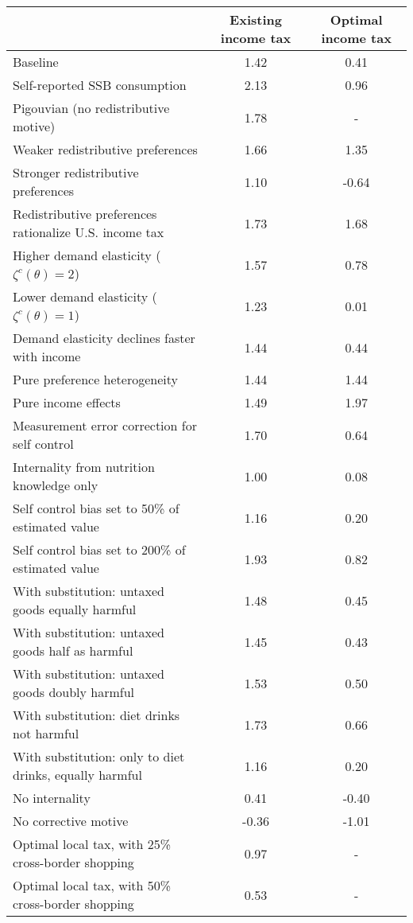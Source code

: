 \begin{tabular}{lcc}
\hline
\hline
 & Existing income tax & Optimal income tax \\
\hline
Baseline & 1.42 & 0.41 \\
Self-reported SSB consumption & 2.13 & 0.96 \\
Pigouvian (no redistributive motive) & 1.78 & - \\
Weaker redistributive preferences & 1.66 & 1.35 \\
Stronger redistributive preferences & 1.10 & -0.64 \\
Redistributive preferences rationalize U.S. income tax & 1.73 & 1.68 \\
Higher demand elasticity ($\zeta^c(\theta) = 2$) & 1.57 & 0.78 \\
Lower demand elasticity ($\zeta^c(\theta) = 1$) & 1.23 & 0.01 \\
Demand elasticity declines faster with income & 1.44 & 0.44 \\
Pure preference heterogeneity & 1.44 & 1.44 \\
Pure income effects & 1.49 & 1.97 \\
Measurement error correction for self control & 1.70 & 0.64 \\
Internality from nutrition knowledge only & 1.00 & 0.08 \\
Self control bias set to 50\% of estimated value & 1.16 & 0.20 \\
Self control bias set to 200\% of estimated value & 1.93 & 0.82 \\
With substitution: untaxed goods equally harmful & 1.48 & 0.45 \\
With substitution: untaxed goods half as harmful & 1.45 & 0.43 \\
With substitution: untaxed goods doubly harmful & 1.53 & 0.50 \\
With substitution: diet drinks not harmful & 1.73 & 0.66 \\
With substitution: only to diet drinks, equally harmful & 1.16 & 0.20 \\
No internality & 0.41 & -0.40 \\
No corrective motive & -0.36 & -1.01 \\
Optimal local tax, with 25\% cross-border shopping & 0.97 & - \\
Optimal local tax, with 50\% cross-border shopping & 0.53 & - \\
\hline
\hline
\end{tabular}

